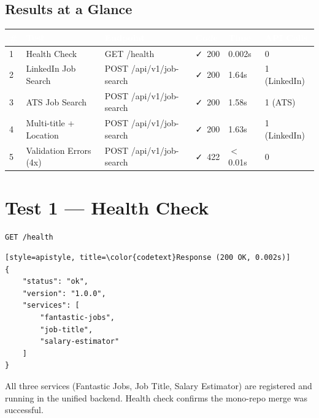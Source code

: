 \documentclass[11pt, a4paper]{article}
\newcommand{\cmark}{\textcolor{success}{\faCheck}}
\begin{document}
\subsection{Results at a Glance}

\begin{center}\small
\begin{tabularx}{\textwidth}{|C{0.6cm}|L{3.8cm}|L{4cm}|C{1cm}|C{1.2cm}|C{1.8cm}|}
\hline
{}
\textcolor{white}{\textbf{\#}} & \textcolor{white}{\textbf{Test}} & \textcolor{white}{\textbf{Endpoint}} & \textcolor{white}{\textbf{Code}} & \textcolor{white}{\textbf{Time}} & \textcolor{white}{\textbf{API Calls}} \\
 & Health Check & GET /health & \cmark~200 & 0.002s & 0 \\
2 & LinkedIn Job Search & POST /api/v1/job-search & \cmark~200 & 1.64s & 1 (LinkedIn) \\
3 & ATS Job Search & POST /api/v1/job-search & \cmark~200 & 1.58s & 1 (ATS) \\
4 & Multi-title + Location & POST /api/v1/job-search & \cmark~200 & 1.63s & 1 (LinkedIn) \\
5 & Validation Errors (4x) & POST /api/v1/job-search & \cmark~422 & $<$0.01s & 0 \\
\hline
\end{tabularx}
\end{center}

\newpage
\section{Test 1 --- Health Check}

\begin{lstlisting}[style=apistyle, title=\color{codetext}Request]
GET /health
\end{lstlisting}

\begin{lstlisting}[style=apistyle, title=\color{codetext}Response (200 OK, 0.002s)]
{
    "status": "ok",
    "version": "1.0.0",
    "services": [
        "fantastic-jobs",
        "job-title",
        "salary-estimator"
    ]
}
\end{lstlisting}

\begin{infobox}
All three services (Fantastic Jobs, Job Title, Salary Estimator) are registered and running in the unified backend. Health check confirms the mono-repo merge was successful.
\end{infobox}
\end{document}
